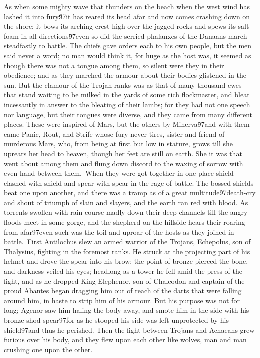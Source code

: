 {As when some mighty wave that thunders on the beach when the west wind has lashed it into fury\'97it has reared its head afar and now comes crashing down on the shore; it bows its arching crest high over the jagged rocks and spews its salt foam in all directions\'97even so did the serried phalanxes of the Danaans march steadfastly to battle. The chiefs gave orders each to his own people, but the men said never a word; no man would think it, for huge as the host was, it seemed as though there was not a tongue among them, so silent were they in their obedience; and as they marched the armour about their bodies glistened in the sun. But the clamour of the Trojan ranks was as that of many thousand ewes that stand waiting to be milked in the yards of some rich flockmaster, and bleat incessantly in answer to the bleating of their lambs; for they had not one speech nor language, but their tongues were diverse, and they came from many different places. These were inspired of Mars, but the others by Minerva\'97and with them came Panic, Rout, and Strife whose fury never tires, sister and friend of murderous Mars, who, from being at first but low in stature, grows till she uprears her head to heaven, though her feet are still on earth. She it was that went about among them and flung down discord to the waxing of sorrow with even hand between them.\
When they were got together in one place shield clashed with shield and spear with spear in the rage of battle. The bossed shields beat one upon another, and there was a tramp as of a great multitude\'97death-cry and shout of triumph of slain and slayers, and the earth ran red with blood. As torrents swollen with rain course madly down their deep channels till the angry floods meet in some gorge, and the shepherd on the hillside hears their roaring from afar\'97even such was the toil and uproar of the hosts as they joined in battle.\
First Antilochus slew an armed warrior of the Trojans, Echepolus, son of Thalysius, fighting in the foremost ranks. He struck at the projecting part of his helmet and drove the spear into his brow; the point of bronze pierced the bone, and darkness veiled his eyes; headlong as a tower he fell amid the press of the fight, and as he dropped King Elephenor, son of Chalcodon and captain of the proud Abantes began dragging him out of reach of the darts that were falling around him, in haste to strip him of his armour. But his purpose was not for long; Agenor saw him haling the body away, and smote him in the side with his bronze-shod spear\'97for as he stooped his side was left unprotected by his shield\'97and thus he perished. Then the fight between Trojans and Achaeans grew furious over his body, and they flew upon each other like wolves, man and man crushing one upon the other.\
}
